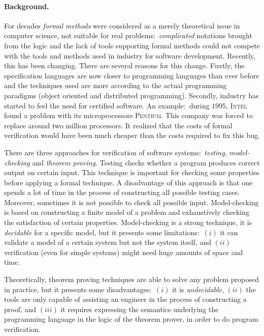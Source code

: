\documentclass[a4paper]{llncs}
\begin{document}
\paragraph{\bf Background.}
For decades \emph{formal methods} were considered as a merely
theoretical issue in computer science, not suitable for real
problems$:$ \emph{complicated} notations brought from the logic and
the lack of tools supporting formal methods could not compete with the
tools and methods used in industry for software development. Recently, 
this has been changing. There are several reasons for this
change. Firstly, the specification languages are now closer to
programming languages than ever before and the techniques used are
more according to the actual programming paradigms (object oriented
and distributed programming). Secondly, industry has started to feel
the need for certified software. An example$:$ during $1995$,
\textsc{Intel} found a problem with its microprocessors
\textsc{Pentium}. This company was forced to replace around two
million processors. It realized that the costs of formal
verification would have been much cheaper than the costs required to
fix this bug.

There are three approaches for verification of software systems$:$
\textit{testing}, \textit{model-checking} and
\textit{theorem proving}. Testing checks whether a program produces
correct output on certain input. This technique is important for
checking some properties before applying a formal technique. A
disadvantage of this approach is that one spends a lot of time in the
process of constructing all possible testing cases. Moreover,
sometimes it is not possible to check all possible
input. Model-checking is based on constructing a finite model of a
problem and exhaustively checking the satisfaction of certain
properties. Model-checking is
a strong technique, it is \emph{decidable} for a specific
model, but it presents some limitations$:$ $(i)$ it can validate a
model of a certain system but not the system itself, and $(ii)$
verification (even for simple systems) might need huge amounts of
space and time. 

Theoretically, theorem proving techniques are able to
solve any problem proposed in practice, but it presents some
disadvantages$:$ $(i)$ it is \emph{undecidable}, $(ii)$ the tools are
only capable of assisting an engineer in the process of constructing a
proof, and $(iii)$ it requires expressing the semantics underlying the
programming language in the logic of the theorem prover, in order to
do program verification. 
\end{document}
